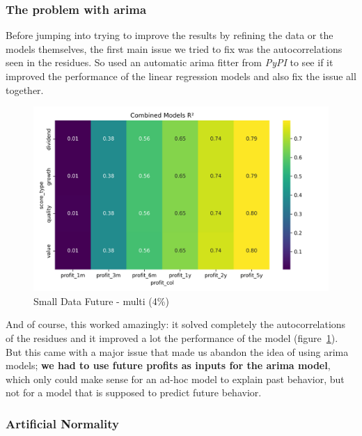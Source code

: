 \documentclass[11pt,english,a4paper,hidelinks]{book}
\begin{document}
\subsubsection{The problem with \acrshort{arima}}

\noindent Before jumping into trying to improve the results by refining the data or the models themselves, the first main issue we tried to fix was the autocorrelations seen in the residues. So used an automatic \acrshort{arima} fitter from \textit{PyPI} \textcite{pmdarima2025} to see if it improved the performance of the linear regression models and also fix the issue all together.

\begin{figure}[H]
    \centering
    \includegraphics[width=1\textwidth]{images/code/models/linear_regression/ARIMA_performance.png}
    \caption{Small Data Future - \acrshort{multi} (4\%)}
    \label{fig:arima_linear_regression}
\end{figure}

\noindent And of course, this worked amazingly: it solved completely the autocorrelations of the residues and it improved a lot the performance of the model (figure~\ref{fig:arima_linear_regression}). But this came with a major issue that made us abandon the idea of using \acrshort{arima} models; \textbf{we had to use future profits as inputs for the \acrshort{arima} model}, which only could make sense for an ad-hoc model to explain past behavior, but not for a model that is supposed to predict future behavior.

\subsubsection{Artificial Normality}
\end{document}
